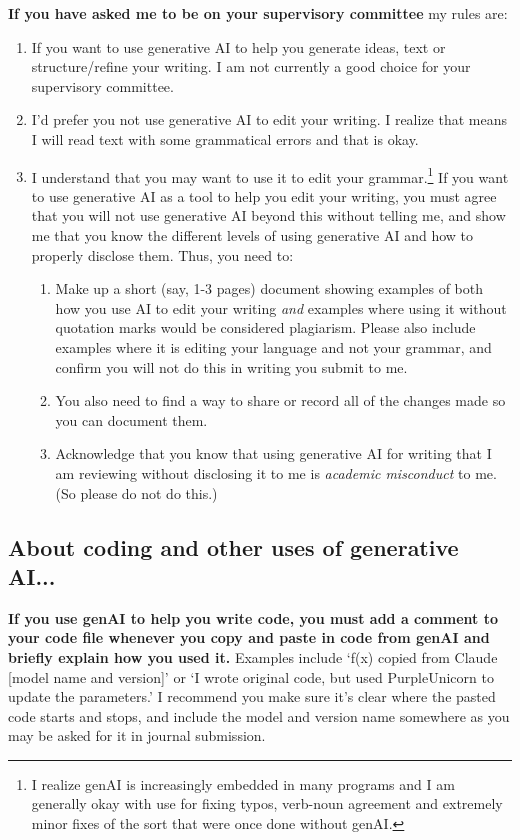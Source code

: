 \documentclass[11pt]{article}
\begin{document}
{\bf If you have asked me to be on your supervisory committee} my rules are:
\begin{enumerate}
\item If you want to use generative AI to help you generate ideas, text or structure/refine your writing. I am not currently a good choice for your supervisory committee. 
\item I’d prefer you not use generative AI to edit your writing. I realize that means I will read text with some grammatical errors and that is okay. 
\item I understand that you may want to use it to edit your grammar.\footnote[5]{I realize genAI is increasingly embedded in many programs and I am generally okay with use for fixing typos, verb-noun agreement and extremely minor fixes of the sort that were once done without genAI.}  If you want to use generative AI as a tool to help you edit your writing, you must agree that you will not use generative AI beyond this without telling me, and show me that you know the different levels of using generative AI and how to properly disclose them. Thus, you need to:
\begin{enumerate}
\item Make up a short (say, 1-3 pages) document showing examples of both how you use AI to edit your writing \emph{and} examples where using it without quotation marks would be considered plagiarism. Please also include examples where it is editing your language and not your grammar, and confirm you will not do this in writing you submit to me.
\item You also need to find a way to share or record all of the changes made so you can document them.
\item Acknowledge that you know that using generative AI for writing that I am reviewing without disclosing it to me is \emph{academic misconduct} to me. (So please do not do this.)
\end{enumerate}
\end{enumerate}

\subsection*{About coding and other uses of generative AI...} 

{\bf If you use genAI to help you write code, you must add a comment to your code file whenever you copy and paste in code from genAI and briefly explain how you used it.} Examples include `f(x) copied from Claude [model name and version]' or `I wrote original code, but used PurpleUnicorn to update the parameters.' I recommend you make sure it's clear where the pasted code starts and stops, and include the model and version name somewhere as you may be asked for it in journal submission. %
\end{document}

